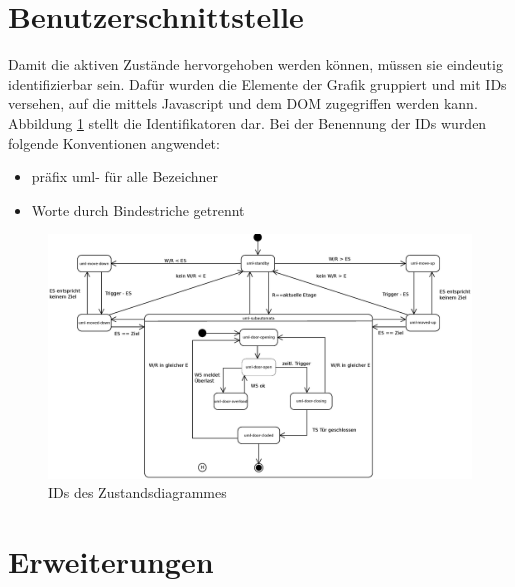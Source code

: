 \section{Benutzerschnittstelle}
Damit die aktiven Zustände hervorgehoben werden können, müssen sie eindeutig identifizierbar sein. Dafür wurden die Elemente der Grafik gruppiert und mit IDs versehen, auf die mittels Javascript und dem \acrshort{DOM} zugegriffen werden kann. Abbildung \ref{fig:ZD_id_view} stellt die Identifikatoren dar. Bei der Benennung der IDs wurden folgende Konventionen angwendet:
\begin{itemize}
	\item präfix uml- für alle Bezeichner
	\item Worte durch Bindestriche getrennt
\end{itemize}

\begin{figure}[hbt]
	\centering
	\includegraphics[width=\textwidth]{images/ZDv6_id_view.eps}
	\caption{IDs des Zustandsdiagrammes}%
	\label{fig:ZD_id_view}%
\end{figure}

\section{Erweiterungen}

